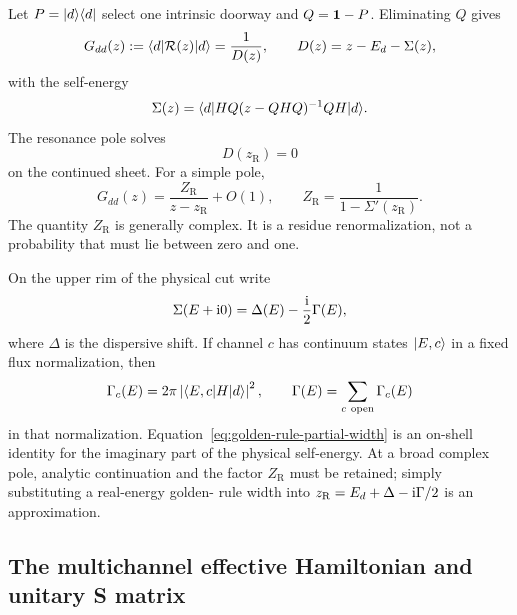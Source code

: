 Let $P=\lvert d \rangle\langle d \rvert$ select one intrinsic doorway and $Q=\mathbf{1}-P$.
Eliminating $Q$ gives
\begin{equation}
  G_{dd}(z)
  :=\langle d \rvert\mathcal{R}(z)\lvert d \rangle
  =\frac{1}{D(z)},
  \qquad
  D(z)=z-E_d-\Sigma(z),
  \label{eq:doorway-green-denominator}
\end{equation}
with the self-energy
\begin{equation}
  \Sigma(z)
  =\langle d \rvert HQ(z-QHQ)^{-1}QH\lvert d \rangle.
  \label{eq:doorway-self-energy}
\end{equation}
The resonance pole solves
\begin{equation}
  D(z_{\mathrm R})=0
  \label{eq:doorway-pole-condition}
\end{equation}
on the continued sheet.  For a simple pole,
\begin{equation}
  G_{dd}(z)
  =\frac{Z_{\mathrm R}}{z-z_{\mathrm R}}+O(1),
  \qquad
  Z_{\mathrm R}
  =\frac{1}{1-\Sigma'(z_{\mathrm R})}.
  \label{eq:doorway-wavefunction-renormalization}
\end{equation}
The quantity $Z_{\mathrm R}$ is generally complex.  It is a residue
renormalization, not a probability that must lie between zero and one.

On the upper rim of the physical cut write
\begin{equation}
  \Sigma(E+\mathrm{i}0)
  =\Delta(E)-\frac{\mathrm{i}}{2}\Gamma(E),
  \label{eq:self-energy-real-axis}
\end{equation}
where $\Delta$ is the dispersive shift.  If channel $c$ has continuum states
$\lvert E,c \rangle$ in a fixed flux normalization, then
\begin{equation}
  \Gamma_c(E)
  =2\pi\left|\langle E,c \rvert H\lvert d \rangle\right|^2,
  \qquad
  \Gamma(E)=\sum_{c\ \mathrm{open}}\Gamma_c(E)
  \label{eq:golden-rule-partial-width}
\end{equation}
in that normalization.  Equation~\eqref{eq:golden-rule-partial-width} is an
on-shell identity for the imaginary part of the physical self-energy.  At a
broad complex pole, analytic continuation and the factor
$Z_{\mathrm R}$ must be retained; simply substituting a real-energy golden-
rule width into $z_{\mathrm R}=E_d+\Delta-\mathrm{i}\Gamma/2$ is an approximation.

\subsection{The multichannel effective Hamiltonian and unitary S matrix}
\label{subsec:effective-hamiltonian-S}

